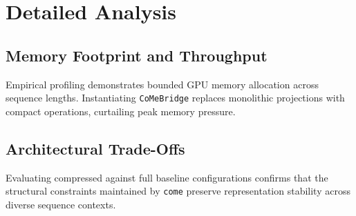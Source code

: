 \section{Detailed Analysis}

\subsection{Memory Footprint and Throughput}
Empirical profiling demonstrates bounded GPU memory allocation across sequence lengths. Instantiating \texttt{CoMeBridge} replaces monolithic projections with compact operations, curtailing peak memory pressure.

\subsection{Architectural Trade-Offs}
Evaluating compressed against full baseline configurations confirms that the structural constraints maintained by \texttt{come} preserve representation stability across diverse sequence contexts.
